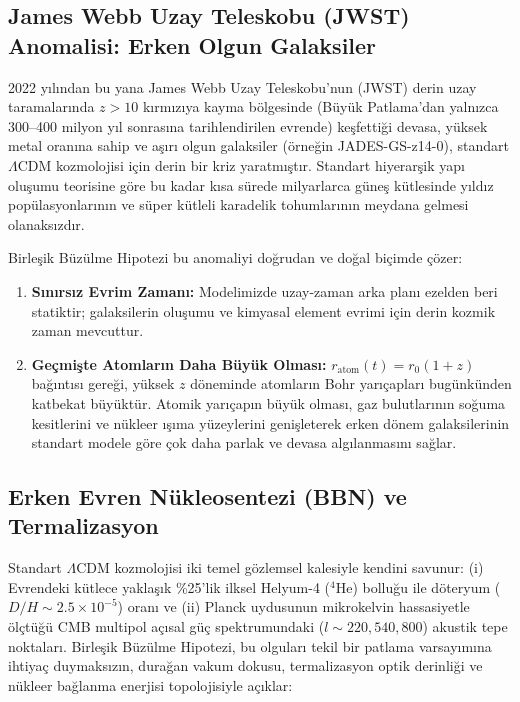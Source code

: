 \subsection{James Webb Uzay Teleskobu (JWST) Anomalisi: Erken Olgun Galaksiler}
2022 yılından bu yana James Webb Uzay Teleskobu'nun (JWST) derin uzay taramalarında $z > 10$ kırmızıya kayma bölgesinde (Büyük Patlama'dan yalnızca 300--400 milyon yıl sonrasına tarihlendirilen evrende) keşfettiği devasa, yüksek metal oranına sahip ve aşırı olgun galaksiler (örneğin JADES-GS-z14-0), standart $\Lambda$CDM kozmolojisi için derin bir kriz yaratmıştır. Standart hiyerarşik yapı oluşumu teorisine göre bu kadar kısa sürede milyarlarca güneş kütlesinde yıldız popülasyonlarının ve süper kütleli karadelik tohumlarının meydana gelmesi olanaksızdır.

Birleşik Büzülme Hipotezi bu anomaliyi doğrudan ve doğal biçimde çözer:
\begin{enumerate}
    \item \textbf{Sınırsız Evrim Zamanı:} Modelimizde uzay-zaman arka planı ezelden beri statiktir; galaksilerin oluşumu ve kimyasal element evrimi için derin kozmik zaman mevcuttur.
    \item \textbf{Geçmişte Atomların Daha Büyük Olması:} $r_{\mathrm{atom}}(t) = r_0 (1+z)$ bağıntısı gereği, yüksek $z$ döneminde atomların Bohr yarıçapları bugünkünden katbekat büyüktür. Atomik yarıçapın büyük olması, gaz bulutlarının soğuma kesitlerini ve nükleer ışıma yüzeylerini genişleterek erken dönem galaksilerinin standart modele göre çok daha parlak ve devasa algılanmasını sağlar.
\end{enumerate}

\subsection{Erken Evren Nükleosentezi (BBN) ve Termalizasyon}
\label{sec:bbn_ve_termalizasyon}

Standart $\Lambda$CDM kozmolojisi iki temel gözlemsel kalesiyle kendini savunur: (i) Evrendeki kütlece yaklaşık \%25'lik ilksel Helyum-4 ($^4\mathrm{He}$) bolluğu ile döteryum ($D/H \sim 2.5 \times 10^{-5}$) oranı ve (ii) Planck uydusunun mikrokelvin hassasiyetle ölçtüğü CMB multipol açısal güç spektrumundaki ($l \sim 220, 540, 800$) akustik tepe noktaları. Birleşik Büzülme Hipotezi, bu olguları tekil bir patlama varsayımına ihtiyaç duymaksızın, durağan vakum dokusu, termalizasyon optik derinliği ve nükleer bağlanma enerjisi topolojisiyle açıklar:

